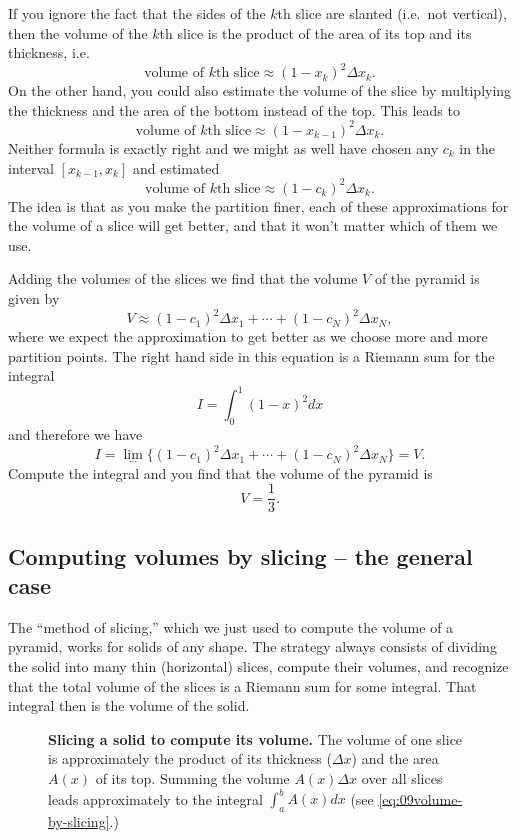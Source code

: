 If you ignore the fact that the sides of the $k$th slice are slanted (i.e.~not
vertical), then the volume of the $k$th slice is the product of the area of its
top and its thickness, i.e.  \marginpar{\footnotesize\sffamily\itshape%
  }%
\[
\text{volume of $k$th slice} \approx (1-x_k)^2\Delta x_k.
\]
On the other hand, you could also estimate the volume of the slice by
multiplying the thickness and the area of the bottom instead of the top.  This
leads to
\[
\text{volume of $k$th slice} \approx (1-x_{k-1})^2\Delta x_k.
\]
Neither formula is exactly right and we might as well have chosen any $c_k$ in
the interval $[x_{k-1}, x_k]$ and estimated
\[
\text{volume of $k$th slice} \approx (1-c_k)^2\Delta x_k.
\]
The idea is that as you make the partition finer, each of these approximations
for the volume of a slice will get better, and that it won't matter which of
them we use.

Adding the volumes of the slices we find that the volume $V$ of the pyramid is
given by
\[
V \approx (1-c_1)^2\Delta x_1 + \cdots + (1-c_N)^2\Delta x_N,
\]
where we expect the approximation to get better as we choose more and more
partition points.  The right hand side in this equation is a Riemann sum for the
integral
\[
I = \int_0^1 (1-x)^2dx
\]
and therefore we have
\[
I = \lim_{\cdots} \bigl\{ (1-c_1)^2\Delta x_1 + \cdots + (1-c_N)^2\Delta x_N
\bigr\} =V.
\]
Compute the integral and you find that the volume of the pyramid is
\[
V = \frac13.
\]

\subsection{Computing volumes by slicing -- the general case}
The ``method of slicing,'' which we just used to compute the volume of a
pyramid, works for solids of any shape.  The strategy always consists of
dividing the solid into many thin (horizontal) slices, compute their volumes,
and recognize that the total volume of the slices is a Riemann sum for some
integral.  That integral then is the volume of the solid.

\begin{figure}[t]
  \centerline{}
  \caption{\textbf{Slicing a solid to compute its volume.}  The volume of one
    slice is approximately the product of its thickness ($\Delta x$) and the
    area $A(x)$ of its top.  Summing the volume $A(x)\Delta x$ over all slices
    leads approximately to the integral $\int_a^b A(x) dx$ (see
    \eqref{eq:09volume-by-slicing}.)}
  \label{fig:09Xslices}
\end{figure}

